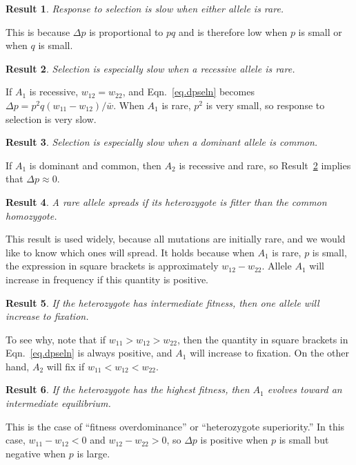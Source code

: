 \documentclass[11pt]{article}
\newtheorem{result}{Result}
\begin{document}
\begin{result}
Response to selection is slow when either allele is rare.
\end{result}
This is because $\Delta p$ is proportional to $pq$ and is therefore
low when $p$ is small or when $q$ is small.

\begin{result}
  Selection is especially slow when a recessive allele is rare.
  \label{res.slowrecess}
\end{result}
If $A_1$ is recessive, $w_{12} = w_{22}$, and Eqn.~\ref{eq.dpseln}
becomes $\Delta p = p^2 q(w_{11} - w_{12})/\bar w$. When $A_1$ is
rare, $p^2$ is very small, so response to selection is very slow.

\begin{result}
  Selection is especially slow when a dominant allele is common.
\end{result}
If $A_1$ is dominant and common, then $A_2$ is recessive and rare, so
Result~\ref{res.slowrecess} implies that $\Delta p \approx 0$.

\begin{result}
A rare allele spreads if its heterozygote is fitter than the common
homozygote.
\label{res.invade}
\end{result}
This result is used widely, because all mutations are initially rare,
and we would like to know which ones will spread. It holds because
when $A_1$ is rare, $p$ is small, the expression in square brackets is
approximately $w_{12} - w_{22}$.  Allele $A_1$ will increase in
frequency if this quantity is positive.

\begin{result}
If the heterozygote has intermediate fitness, then one allele will
increase to fixation.
\end{result}
To see why, note that if $w_{11} > w_{12} > w_{22}$, then the quantity
in square brackets in Eqn.~\ref{eq.dpseln} is always positive, and
$A_1$ will increase to fixation. On the other hand, $A_2$ will fix if
$w_{11} < w_{12} < w_{22}$.

\begin{result}
If the heterozygote has the highest fitness, then $A_1$ evolves toward
an intermediate equilibrium.
\label{res.overdom}
\end{result}
This is the case of ``fitness overdominance'' or ``heterozygote
superiority.'' In this case, $w_{11} - w_{12} < 0$ and $w_{12} -
w_{22} > 0$, so $\Delta p$ is positive when $p$ is small but negative
when $p$ is large.
\end{document}
